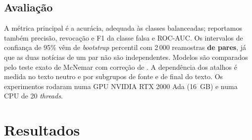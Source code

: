 \subsection{Avaliação}

A métrica principal é a acurácia, adequada às classes balanceadas; reportamos também precisão, revocação e F1 da classe falsa e ROC-AUC. Os intervalos de confiança de 95\% vêm de \emph{bootstrap} percentil \citep{efron1993} com 2\,000 reamostras \textbf{de pares}, já que as duas notícias de um par não são independentes. Modelos são comparados pelo teste exato de McNemar \citep{dietterich1998} com correção de \citet{holm1979}. A dependência dos atalhos é medida no texto neutro e por subgrupos de fonte e de final do texto. Os experimentos rodaram numa GPU NVIDIA RTX 2000 Ada (16~GB) e numa CPU de 20 \emph{threads}.

\section{Resultados}

